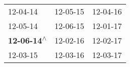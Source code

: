 \begin{supertabular}{lll}
                  12-04-14\textsuperscript{} &  12-05-15\textsuperscript{} &  12-04-16\textsuperscript{} \\
                  12-05-14\textsuperscript{} &  12-06-15\textsuperscript{} &  12-01-17\textsuperscript{} \\
 \textbf{12-06-14\textsuperscript{$\wedge$}} &  12-02-16\textsuperscript{} &  12-02-17\textsuperscript{} \\
                  12-03-15\textsuperscript{} &  12-03-16\textsuperscript{} &  12-03-17\textsuperscript{} \\
\end{supertabular}
